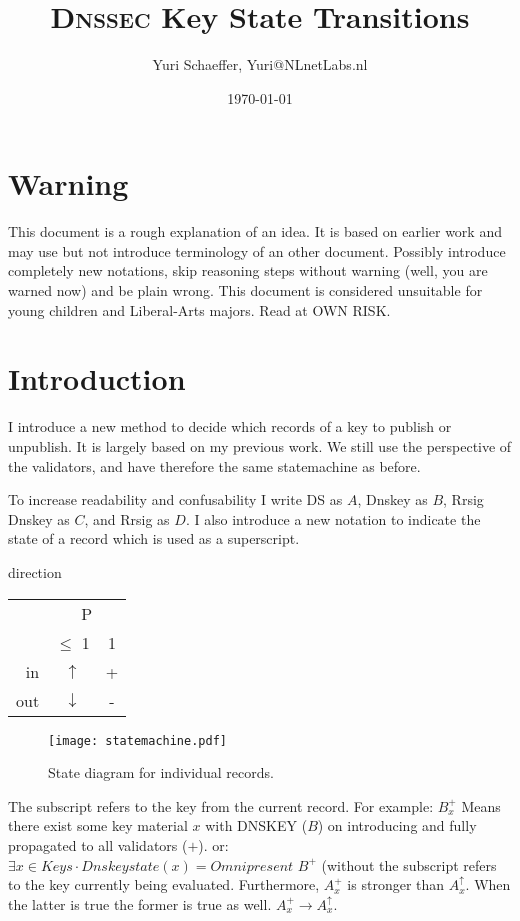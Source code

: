 \documentclass[twoside, a4paper]{article}
\title{\textsc{Dnssec} Key State Transitions}
\author{Yuri Schaeffer, Yuri@NLnetLabs.nl}
\date{\today}
\begin{document}
\maketitle

\section{Warning}
This document is a rough explanation of an idea. It is based on earlier
work and may use but not introduce terminology of an other document. 
Possibly introduce completely new notations, skip reasoning steps without 
warning (well, you are warned now) and be plain wrong. This document is considered unsuitable
for young children and Liberal-Arts majors. Read at OWN RISK.

\section{Introduction}
I introduce a new method to decide which records of a key to publish
or unpublish. It is largely based on my previous work. We still use
the perspective of the validators, and have therefore the same statemachine
as before.

To increase readability and confusability I write DS as $A$, Dnskey as $B$,
Rrsig Dnskey as $C$, and Rrsig as $D$. I also introduce a new notation 
to indicate the state of a record which is used as a superscript.

direction
\begin{tabular}{ r | c  c }
	& \multicolumn{2}{c}{P} \\
   & $\leq$ 1 & 1 \\ \hline
  in & $\uparrow$ & + \\
  out & $\downarrow$ & - \\
\end{tabular}

\begin{figure}[h]
	\centering
	\texttt{[image: statemachine.pdf]}
	\caption{State diagram for individual records.}
	\label{fig:statemachine}
\end{figure}

The subscript refers to the key from the current record. For example:
$B_{x}^{+}$ Means there exist some key material $x$ with DNSKEY ($B$) on introducing 
and fully propagated to all validators ($+$). or: $\exists x \in Keys \cdot Dnskeystate(x) = Omnipresent$
$B^{+}$ (without the subscript refers to the key currently being evaluated.
Furthermore, $A_{x}^{+}$ is stronger than $A_{x}^{\uparrow}$. When the latter is true
the former is true as well.  $A_{x}^{+} \rightarrow A_{x}^{\uparrow}$.
\end{document}
